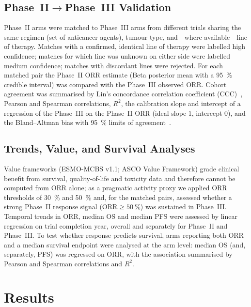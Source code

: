 \documentclass[cancers,article,submit,pdftex,moreauthors]{Definitions/mdpi}
\begin{document}
\subsection{Phase~II$\rightarrow$Phase~III Validation}
Phase~II arms were matched to Phase~III arms from different trials sharing the same
regimen (set of anticancer agents), tumour type, and---where available---line of
therapy. Matches with a confirmed, identical line of therapy were labelled high
confidence; matches for which line was unknown on either side were labelled medium
confidence; matches with discordant lines were rejected. For each matched pair the
Phase~II ORR estimate (Beta posterior mean with a \SI{95}{\percent} credible
interval) was compared with the Phase~III observed ORR. Cohort agreement was
summarised by Lin's concordance correlation coefficient (CCC)~\cite{lin1989},
Pearson and Spearman correlations, $R^{2}$, the calibration slope and intercept of a
regression of the Phase~III on the Phase~II ORR (ideal slope $1$, intercept $0$),
and the Bland--Altman bias with \SI{95}{\percent} limits of
agreement~\cite{blandaltman1986}.

\subsection{Trends, Value, and Survival Analyses}
Value frameworks (ESMO-MCBS v1.1; ASCO Value Framework) grade clinical benefit from
survival, quality-of-life and toxicity data and therefore cannot be computed from
ORR alone; as a pragmatic activity proxy we applied ORR thresholds of
\SI{30}{\percent} and \SI{50}{\percent} and, for the matched pairs, assessed whether
a strong Phase~II response signal (ORR$\ge\SI{50}{\percent}$) was sustained in
Phase~III. Temporal trends in ORR, median OS and median PFS were assessed by linear
regression on trial completion year, overall and separately for Phase~II and
Phase~III. To test whether response predicts survival, arms reporting both ORR and a
median survival endpoint were analysed at the arm level: median OS (and, separately,
PFS) was regressed on ORR, with the association summarised by Pearson and Spearman
correlations and $R^{2}$.

\section{Results}
\end{document}
